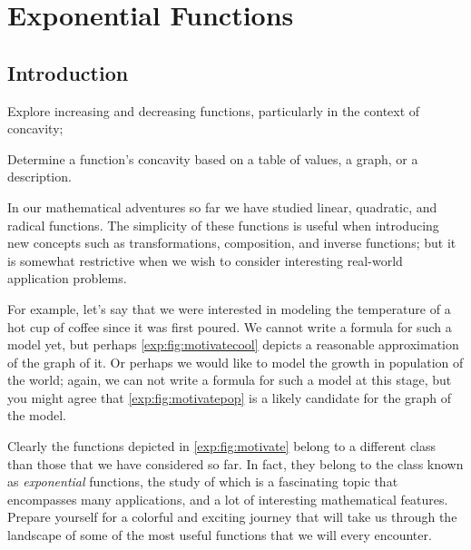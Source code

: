 %
%
\chapter{Exponential Functions}
\minitoc
\section{Introduction}
\begin{outcomes}
	\begin{outcomelist}
		\item Explore increasing and decreasing functions, particularly in the context of concavity;
		\item Determine a function's concavity based on a table of values, a graph, or a description. 
	\end{outcomelist}
\end{outcomes}
In our mathematical adventures so far we have studied linear, quadratic, 
and radical functions. The simplicity of these functions is useful when 
introducing new concepts such as transformations, composition, and 
inverse functions; but it is somewhat restrictive when we wish to 
consider interesting real-world application problems. 

For example, let's say that we were interested in modeling the 
temperature of a hot cup of coffee since it was first poured. We cannot 
write a formula for such a model yet, but perhaps \cref{exp:fig:motivatecool} depicts a reasonable
approximation of the graph of it. Or perhaps
we would like to model the growth in population of the world; again, 
we can not write a formula for such a model at this stage, but you 
might agree that \cref{exp:fig:motivatepop} is a likely candidate 
for the graph of the model.

Clearly the functions depicted in \cref{exp:fig:motivate} belong to 
a different class than those that we have considered so far. In fact, they 
belong to the class known as \emph{exponential} functions, the study of 
which is a fascinating topic that encompasses many applications, and a lot 
of interesting mathematical features. Prepare yourself for a colorful 
and exciting
journey that will take us through the landscape of some of the most useful 
functions that we will every encounter.

